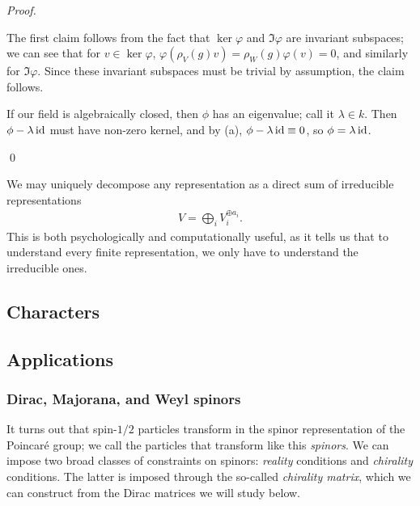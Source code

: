 \documentclass[11pt]{article}
\begin{document}
\begin{proof}
    \begin{alphamerate}
        \item The first claim follows from the fact that $\ker{\varphi}$
        and $\Im{\varphi}$ are invariant subspaces; we can see that for
        $v \in \ker{\varphi}$, $\varphi(\rho_V(g) v) = \rho_W(g) \varphi(v) = 0$,
        and similarly for $\Im{\varphi}$. Since these invariant subspaces
        must be trivial by assumption, the claim follows.
        \item If our field is algebraically closed, then $\phi$ has an eigenvalue;
        call it $\lambda \in k$. Then $\phi - \lambda \operatorname{id}$ must have non-zero kernel,
        and by (a), $\phi - \lambda \operatorname{id} \equiv 0$, so $\phi = \lambda \operatorname{id}$.
    \end{alphamerate}
    \qed
\end{proof}

\begin{corollary}
    We may uniquely decompose any representation as a direct
    sum of irreducible representations
    \begin{align*}
        V = \bigoplus_i V_i^{\oplus a_i}.
    \end{align*}
    This is both psychologically and computationally useful,
    as it tells us that to understand every finite representation,
    we only have to understand the irreducible ones.
\end{corollary}

\subsection{Characters}


\subsection{Applications}

\subsubsection{Dirac, Majorana, and Weyl spinors}

\begin{reemark}
    It turns out that spin-$1/2$ particles transform in the spinor
    representation of the Poincaré group; we call the particles
    that transform like this \emph{spinors}. We can impose two
    broad classes of constraints on spinors: \emph{reality} conditions
    and \emph{chirality} conditions. The latter is imposed through the
    so-called \emph{chirality matrix}, which we can construct from
    the Dirac matrices we will study below.
\end{reemark}
\end{document}
